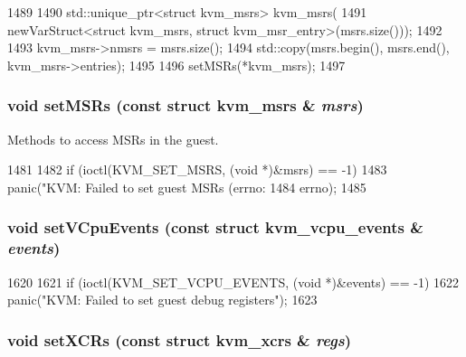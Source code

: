 \begin{DoxyCode}
1489 {
1490     std::unique_ptr<struct kvm_msrs> kvm_msrs(
1491         newVarStruct<struct kvm_msrs, struct kvm_msr_entry>(msrs.size()));
1492 
1493     kvm_msrs->nmsrs = msrs.size();
1494     std::copy(msrs.begin(), msrs.end(), kvm_msrs->entries);
1495 
1496     setMSRs(*kvm_msrs);
1497 }
\end{DoxyCode}
\hypertarget{classX86KvmCPU_a37c723660e4a4aa0ebb42ee498df990b}{
\subsubsection[{setMSRs}]{\setlength{\rightskip}{0pt plus 5cm}void setMSRs (const struct kvm\_\-msrs \& {\em msrs})}}
\label{classX86KvmCPU_a37c723660e4a4aa0ebb42ee498df990b}
Methods to access MSRs in the guest. 


\begin{DoxyCode}
1481 {
1482     if (ioctl(KVM_SET_MSRS, (void *)&msrs) == -1)
1483         panic("KVM: Failed to set guest MSRs (errno: %
1484               errno);
1485 }
\end{DoxyCode}
\hypertarget{classX86KvmCPU_a70cfa7f84580af5396fbc82f540c8a5b}{
\subsubsection[{setVCpuEvents}]{\setlength{\rightskip}{0pt plus 5cm}void setVCpuEvents (const struct kvm\_\-vcpu\_\-events \& {\em events})}}
\label{classX86KvmCPU_a70cfa7f84580af5396fbc82f540c8a5b}



\begin{DoxyCode}
1620 {
1621     if (ioctl(KVM_SET_VCPU_EVENTS, (void *)&events) == -1)
1622         panic("KVM: Failed to set guest debug registers\n");
1623 }
\end{DoxyCode}
\hypertarget{classX86KvmCPU_a929420a323cb83ab21bdf3efa22edd24}{
\subsubsection[{setXCRs}]{\setlength{\rightskip}{0pt plus 5cm}void setXCRs (const struct kvm\_\-xcrs \& {\em regs})}}
\label{classX86KvmCPU_a929420a323cb83ab21bdf3efa22edd24}



